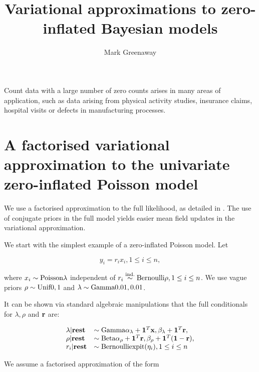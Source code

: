 \documentclass{amsart}[12pt]
\title{Variational approximations to zero-inflated Bayesian models}
\author{Mark Greenaway}
\begin{document}
\maketitle
\noindent Count data with a large number of zero counts arises in many areas of
application, such as data arising from physical activity studies, 
insurance claims, hospital visits or defects in manufacturing processes.

\section{A factorised variational approximation to the univariate zero-inflated Poisson model}


\noindent We use a factorised approximation to the full likelihood, as detailed in \cite{ormerod10}.
The use of conjugate priors in the full model yields easier mean field updates in the
variational approximation.

\noindent We start with the simplest example of a zero-inflated Poisson model. Let

$$
y_i = r_i x_i, 1 \leq i \leq n,
$$

\noindent where $x_i \sim \text{Poisson} \lambda$ independent of $r_i \stackrel{\text{ind.}}{\sim} \text{Bernoulli} \rho, 1 \leq i \leq n$. We use vague priors
$\rho \sim \text{Unif} 0, 1$ and $\lambda \sim \text{Gamma} 0.01, 0.01$. 

\noindent It can be shown via standard algebraic manipulations that the
full conditionals for $\lambda, \rho$ and ${\bf r}$ are:

$$
\begin{array}{ll}
\lambda | \textbf{rest} &\sim \text{Gamma} \alpha_\lambda + {\bf 1}^T{\bf x}, \beta_\lambda + {\bf 1}^T{\bf r}, \\
\rho | \textbf{rest} &\sim \text{Beta} \alpha_\rho + {\bf 1}^T {\bf r}, \beta_\rho + {\bf 1}^T({\bf 1} - {\bf r}), \\
r_i | \textbf{rest} &\sim \text{Bernoulli} \text{expit}(\eta_i), 1 \leq i \leq n
\end{array}
$$


\noindent We assume a factorised approximation of the form
\end{document}
